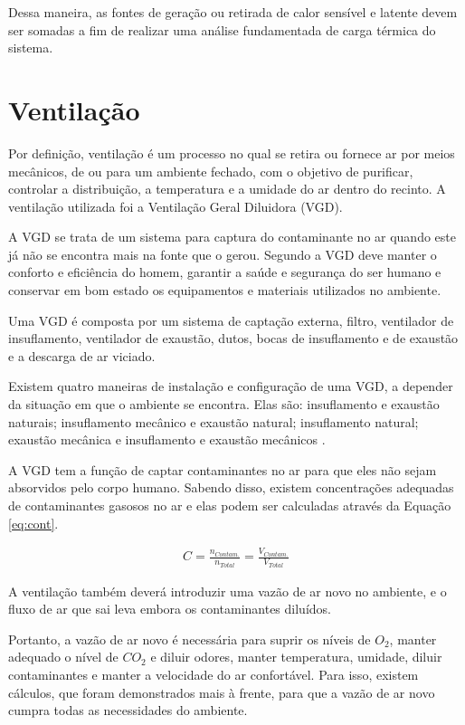 \documentclass[acronym,symbols,table]{fei}
\begin{document}
Dessa maneira, as fontes de geração ou retirada de calor sensível e latente devem ser somadas a fim de realizar uma análise fundamentada de carga térmica do sistema. 

\section{Ventilação} \label{ventilação}

Por definição, ventilação é um processo no qual se retira ou fornece ar por meios mecânicos, de ou para um ambiente fechado, com o objetivo de purificar, controlar a distribuição, a temperatura e a umidade do ar dentro do recinto. A ventilação utilizada foi a Ventilação Geral Diluidora (VGD). 

A VGD se trata de um sistema para captura do contaminante no ar quando este já não se encontra mais na fonte que o gerou. Segundo \textcite{ventilacaoindustrial} a VGD deve manter o conforto e eficiência do homem, garantir a saúde e segurança do ser humano e conservar em bom estado os equipamentos e materiais utilizados no ambiente.

Uma VGD é composta por um sistema de captação externa, filtro, ventilador de insuflamento, ventilador de exaustão, dutos, bocas de insuflamento e de exaustão e a descarga de ar viciado.

Existem quatro maneiras de instalação e configuração de uma VGD, a depender da situação em que o ambiente se encontra. Elas são: insuflamento e exaustão naturais; insuflamento mecânico e exaustão natural; insuflamento natural; exaustão mecânica e insuflamento e exaustão mecânicos \cite{ventilacaoindustrial}.

A VGD tem a função de captar contaminantes no ar para que eles não sejam absorvidos pelo corpo humano. Sabendo disso, existem concentrações adequadas de contaminantes gasosos no ar e elas podem ser calculadas através da Equação \ref{eq:cont}.

\begin{equation} \label{eq:cont}
    \begin{aligned}
C=\frac{n_{Contam.}}{n_{Total}}=\frac{V_{Contam.}}{V_{Total}}
    \end{aligned}
\end{equation}

A ventilação também deverá introduzir uma vazão de ar novo no ambiente, e o fluxo de ar que sai leva embora os contaminantes diluídos. 

Portanto, a vazão de ar novo é necessária para suprir os níveis de ${O}_{2}$, manter adequado o nível de ${CO}_{2}$ e diluir odores, manter temperatura, umidade, diluir contaminantes e manter a velocidade do ar confortável. Para isso, existem cálculos, que foram demonstrados mais à frente, para que a vazão de ar novo cumpra todas as necessidades do ambiente.
\end{document}
